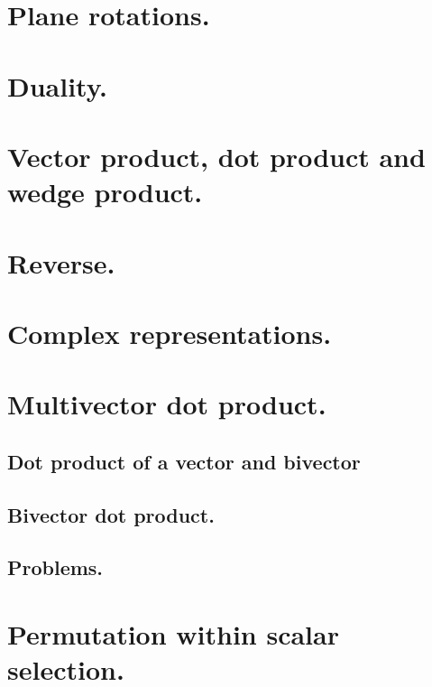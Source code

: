    \section{Plane rotations.}
      
   \section{Duality.}
     
   \section{Vector product, dot product and wedge product.}
      
   \section{Reverse.}
      
   \section{Complex representations.}
      
   \section{Multivector dot product.}
      
      \subsection{Dot product of a vector and bivector}
         
      \subsection{Bivector dot product.}
         
      \subsection{Problems.}
         
   \section{Permutation within scalar selection.}
      
